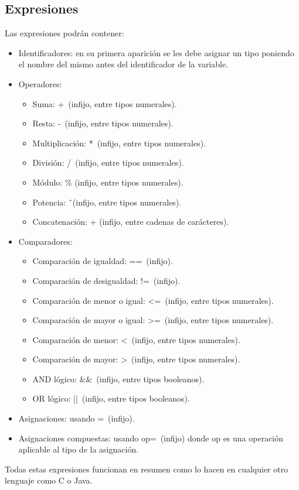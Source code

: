\documentclass[a4paper, 12pt]{article}
\begin{document}
\subsection{Expresiones}
Las expresiones podrán contener:
\begin{itemize}
\item Identificadores: en su primera aparición se les debe asignar un tipo poniendo el nombre del mismo antes del identificador de la variable.
\item Operadores:
	\begin{itemize}
	\item Suma: +\ (infijo, entre tipos numerales).
	\item Resta: -\ (infijo, entre tipos numerales).
	\item Multiplicación: *\ (infijo, entre tipos numerales).
	\item División: /\ (infijo, entre tipos numerales).
	\item Módulo: \% (infijo, entre tipos numerales).
	\item Potencia: \^\ (infijo, entre tipos numerales).
	\item Concatenación: + (infijo, entre cadenas de carácteres).
	\end{itemize}
\item Comparadores:
	\begin{itemize}
	\item Comparación de igualdad: ==\ (infijo).
	\item Comparación de desigualdad: !=\ (infijo).
	\item Comparación de menor o igual: <=\ (infijo, entre tipos numerales).
	\item Comparación de mayor o igual: >=\ (infijo, entre tipos numerales).
	\item Comparación de menor: <\ (infijo, entre tipos numerales).
	\item Comparación de mayor: >\ (infijo, entre tipos numerales).
	\item AND lógico: \&\&\ (infijo, entre tipos booleanos).
	\item OR lógico: ||\ (infijo, entre tipos booleanos).
	\end{itemize}
\item Asignaciones: usando =\ (infijo).
\item Asignaciones compuestas: usando op=\ (infijo) donde op es una operación aplicable al tipo de la asignación.
\end{itemize}
Todas estas expresiones funcionan en resumen como lo hacen en cualquier otro lenguaje como C o Java.
\newpage
\end{document}
